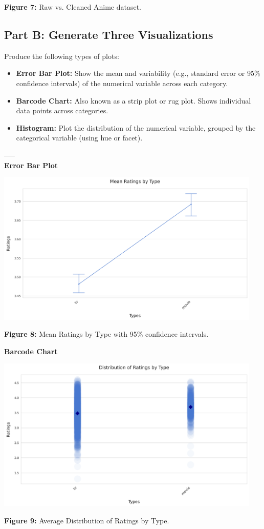 \begin{center}
    \textbf{Figure 7:} Raw vs. Cleaned Anime dataset.
\end{center}
\newpage

\subsection{Part B: Generate Three Visualizations}
Produce the following types of plots:
\begin{itemize}
    \item \textbf{Error Bar Plot:} Show the mean and variability (e.g., standard error or 95\% confidence intervals) of the numerical variable across each category.
    \item \textbf{Barcode Chart:} Also known as a strip plot or rug plot. Shows individual data points across categories.
    \item \textbf{Histogram:} Plot the distribution of the numerical variable, grouped by the categorical variable (using hue or facet).
\end{itemize}
-----\\
\textbf{Error Bar Plot}
\begin{center}
  \includegraphics[width=0.95\textwidth]{figures/ratings_by_type_error_bar_plot.png}
  
  \textbf{Figure 8:} Mean Ratings by Type with 95\% confidence intervals.
\end{center}

\textbf{Barcode Chart}
\begin{center}
  \includegraphics[width=0.95\textwidth]{figures/ratings_by_type_strip_plot.png}
  
  \textbf{Figure 9:} Average Distribution of Ratings by Type.
\end{center}

